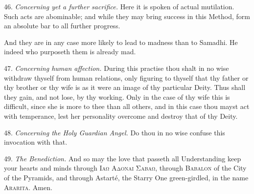 46. \textit{Concerning yet a further sacrifice.} Here it is spoken of actual mutilation. Such acts are abominable; and while they may bring success in this Method, form an absolute bar to all further progress.

And they are in any case more likely to lead to madness than to Samadhi. He indeed who purposeth them is already mad.

47. \textit{Concerning human affection.} During this practise thou shalt in no wise withdraw thyself from human relations, only figuring to thyself that thy father or thy brother or thy wife is as it were an image of thy particular Deity. Thus shall they gain, and not lose, by thy working. Only in the case of thy wife this is difficult, since she is more to thee than all others, and in this case thou mayst act with temperance, lest her personality overcome and destroy that of thy Deity.

48. \textit{Concerning the Holy Guardian Angel.} Do thou in no wise confuse this invocation with that.

49. \textit{The Benediction.} And so may the love that passeth all Understanding keep your hearts and minds through \textsc{Ιαω Αδοναι Σαβαω}, through \textsc{Babalon} of the City of the Pyramids, and through Astart\'{e}, the Starry One green-girdled, in the name \textsc{Ararita}. Amen.

